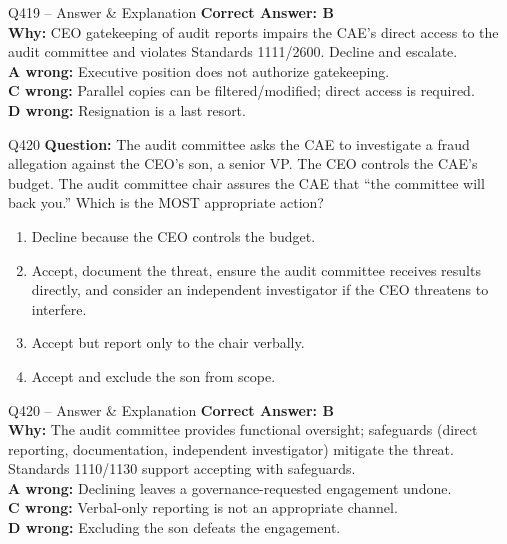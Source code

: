 \documentclass[aspectratio=169,10pt]{beamer}
\begin{document}
	\begin{frame}[t]{Q419 -- Answer \& Explanation}
		\small
		\textbf{Correct Answer: B} \\[4pt]
		\textbf{Why:} CEO gatekeeping of audit reports impairs the CAE's direct access to the audit committee and violates Standards 1111/2600. Decline and escalate. \\[4pt]
		\textbf{A wrong:} Executive position does not authorize gatekeeping. \\[2pt]
		\textbf{C wrong:} Parallel copies can be filtered/modified; direct access is required. \\[2pt]
		\textbf{D wrong:} Resignation is a last resort.
	\end{frame}
	
	\begin{frame}[t]{Q420}
		\small
		\textbf{Question:} The audit committee asks the CAE to investigate a fraud allegation against the CEO's son, a senior VP. The CEO controls the CAE's budget. The audit committee chair assures the CAE that ``the committee will back you.'' Which is the MOST appropriate action?
		\begin{enumerate}[label=\Alph*.,itemsep=1pt,topsep=2pt]
			\item Decline because the CEO controls the budget.
			\item Accept, document the threat, ensure the audit committee receives results directly, and consider an independent investigator if the CEO threatens to interfere.
			\item Accept but report only to the chair verbally.
			\item Accept and exclude the son from scope.
		\end{enumerate}
	\end{frame}
	
	\begin{frame}[t]{Q420 -- Answer \& Explanation}
		\small
		\textbf{Correct Answer: B} \\[4pt]
		\textbf{Why:} The audit committee provides functional oversight; safeguards (direct reporting, documentation, independent investigator) mitigate the threat. Standards 1110/1130 support accepting with safeguards. \\[4pt]
		\textbf{A wrong:} Declining leaves a governance-requested engagement undone. \\[2pt]
		\textbf{C wrong:} Verbal-only reporting is not an appropriate channel. \\[2pt]
		\textbf{D wrong:} Excluding the son defeats the engagement.
	\end{frame}
	
\end{document}
